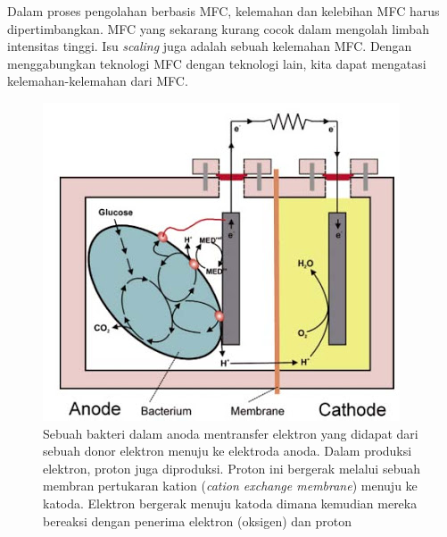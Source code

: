 \documentclass[10pt,a4paper,hidelinks]{article}
\begin{document}
Dalam proses pengolahan berbasis MFC, kelemahan dan kelebihan MFC  harus dipertimbangkan. MFC yang sekarang kurang cocok dalam mengolah limbah intensitas tinggi. Isu \textit{scaling} juga adalah sebuah kelemahan MFC. Dengan menggabungkan teknologi MFC dengan teknologi lain, kita dapat mengatasi kelemahan-kelemahan dari MFC.
	\begin{figure}[!ht]
	\centering
		\includegraphics[scale=0.75]{gfx/mfc}
		\caption{Sebuah bakteri dalam anoda mentransfer elektron yang didapat dari sebuah donor elektron menuju ke elektroda anoda. Dalam produksi elektron, proton juga diproduksi. Proton ini bergerak melalui sebuah membran pertukaran kation (\textit{cation exchange membrane}) menuju ke katoda. Elektron bergerak menuju katoda dimana kemudian mereka bereaksi dengan penerima elektron (oksigen) dan proton}
	\end{figure}
\end{document}
